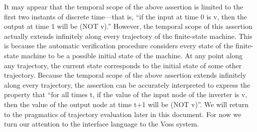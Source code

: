 It may appear that the temporal scope%
%
{} of the above assertion is
limited to the first two instants of discrete time---that is, ``if
the input at time 0 is v, then the output at time 1 will be (NOT
v).'' However, the temporal scope of this assertion actually extends
infinitely along every trajectory of the finite-state machine. This
is because the automatic verification procedure considers every
state of the finite-state machine to be a possible initial state%
%
{}
of the machine. At any point along any trajectory, the current
state corresponds to the initial state of some other trajectory.
Because the temporal scope of the above assertion extends infinitely
along every trajectory, the assertion can be accurately interpreted
to express the property that ``for all times t, if the value of
the input node of the inverter is v, then the value of the output
node at time t+1 will be (NOT v)''.  We will return to the pragmatics
of trajectory evaluation later in this document. For now we turn
our attention to the interface language to the Voss system.
